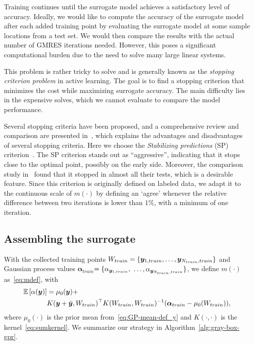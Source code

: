 Training continues until the surrogate model achieves a satisfactory level of accuracy.
Ideally, we would like to compute the accuracy of the surrogate model after each added training point by evaluating the surrogate model at some sample locations from a test set.
We would then compare the results with the actual number of GMRES iterations needed.
However, this poses a significant computational burden due to the need to solve many large linear systems.

This problem is rather tricky to solve and is generally known as the \emph{stopping criterion problem} in active learning.
The goal is to find a stopping criterion that minimizes the cost while maximizing surrogate accuracy.
The main difficulty lies in the expensive solves, which we cannot evaluate to compare the model performance.

Several stopping criteria have been proposed, and a comprehensive review and comparison are presented in~\cite{pullar-strecker2024}, which explains the advantages and disadvantages of several stopping criteria.
Here we choose the \emph{Stabilizing predictions} (SP) criterion~\cite{bloodgood2009,cohen1960}.
The SP criterion stands out as ``aggressive'', indicating that it stops close to the optimal point, possibly on the early side.
Moreover, the comparison study in~\cite{pullar-strecker2024} found that it stopped in almost all their tests, which is a desirable feature.
Since this criterion is originally defined on labeled data, we adapt it to the continuous scale of $m(\cdot)$ by defining an `agree' whenever the relative difference between two iterations is lower than $1\%$, with a minimum of one iteration.

\subsection{Assembling the surrogate}\label{subsec:assembling-the-surrogate}
With the collected training points $W_{train}=\left\{ {\bm{y}}_{1,train}, \ldots, {\bm{y}}_{N_{train}, train} \right\}$ and Gaussian process values $\bm{\alpha}_{train}$$=\{ \alpha_{{\bm{y}}_{1, train}} ,$ $ \ldots,\alpha_{{\bm{y}}_{N_{train}, train}} \}$, we define $m(\cdot)$ as~\eqref{eq:mdef}, with
\begin{align*}
    \mathbb{E}\left[\alpha({\bm{y}})\right] &= \mu_0({\bm{y}}) + \\&  K({\bm{y}}+\bar{\bm{y}}, W_{train})^\top K(W_{train},W_{train})^{-1}(\bm{\alpha}_{train}-\mu_0(W_{train})),
\end{align*}
where $\mu_0(\cdot)$ is the prior mean from~\eqref{eq:GP-mean-def_y} and $K(\cdot, \cdot)$ is the kernel~\eqref{eq:sumkernel}.
We summarize our strategy in Algorithm~\ref{alg:gray-box-gpr}.

